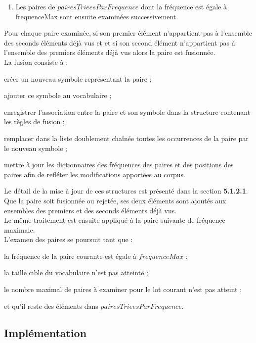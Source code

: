 \documentclass[12pt,a4paper]{report}
\begin{document}
\begin{enumerate}
\begin{enumerate}
			\item Les paires de $pairesTrieesParFrequence$ dont la fréquence est égale à frequenceMax sont ensuite examinées successivement.
		\end{enumerate}
		Pour chaque paire examinée, si son premier élément n'appartient pas à l'ensemble des seconds éléments déjà vus et et si son second élément n'appartient pas à l'ensemble des premiers éléments déjà vus alors la paire est fusionnée.\\
		La fusion consiste à :
		Le détail de la mise à jour de ces structures est présenté dans la section \textbf{5.1.2.1}.\\
		Que la paire soit fusionnée ou rejetée, ses deux éléments sont ajoutés aux ensembles des premiers et des seconds éléments déjà vus.\\
		Le même traitement est ensuite appliqué à la paire suivante de fréquence maximale.\\
		L'examen des paires se poursuit tant que :
	\end{enumerate}
	
	\subsection{Implémentation}
	
\end{document}
